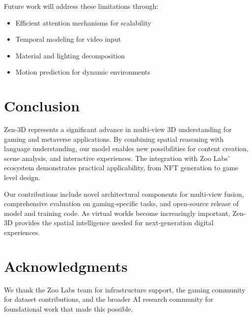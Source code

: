 \documentclass[11pt,a4paper]{article}
\begin{document}
Future work will address these limitations through:
\begin{itemize}
\item Efficient attention mechanisms for scalability
\item Temporal modeling for video input
\item Material and lighting decomposition
\item Motion prediction for dynamic environments
\end{itemize}

\section{Conclusion}

Zen-3D represents a significant advance in multi-view 3D understanding for gaming and metaverse applications. By combining spatial reasoning with language understanding, our model enables new possibilities for content creation, scene analysis, and interactive experiences. The integration with Zoo Labs' ecosystem demonstrates practical applicability, from NFT generation to game level design.

Our contributions include novel architectural components for multi-view fusion, comprehensive evaluation on gaming-specific tasks, and open-source release of model and training code. As virtual worlds become increasingly important, Zen-3D provides the spatial intelligence needed for next-generation digital experiences.

\section{Acknowledgments}

We thank the Zoo Labs team for infrastructure support, the gaming community for dataset contributions, and the broader AI research community for foundational work that made this possible.
\end{document}
